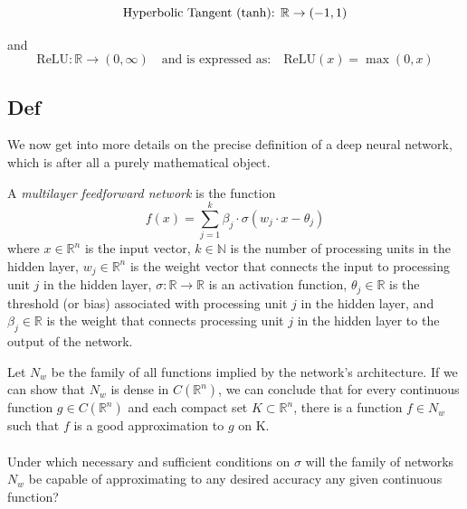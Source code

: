 \documentclass[../main.tex]{subfiles}
\begin{document}
	
	
	\[
	\text{Hyperbolic Tangent (\text{tanh}): } \mathbb{R} \to (-1,1)
	\]
	
	

	 and 
	  \[
	 \text{ReLU}: \mathbb{R} \to (0,\infty)
	 \quad \text{and is expressed as:} \quad
	 \text{ReLU}(x) = \max(0,x)
	 \]
	 \subsection{Def}
	 \noindent  We now get into more details on the precise definition of a deep neural network, which is after all a purely mathematical object. 
	 \begin{definition} A \textit{multilayer feedforward network} is the function
	 	$$f(x)=\sum_{j=1}^k \beta_j \cdot \sigma(w_j \cdot x - \theta_j)$$
	 	where $x \in \mathbb{R}^n$ is the input vector, $k \in \mathbb{N}$ is the number of processing units in the hidden layer, $w_j \in \mathbb{R}^n$ is the weight vector that connects the input to processing unit $j$ in the hidden layer, $\sigma : \mathbb{R} \rightarrow \mathbb{R}$ is an activation function, $\theta_j \in \mathbb{R}$ is the threshold (or bias) associated with processing unit $j$ in the hidden layer, and $\beta_j \in \mathbb{R}$ is the weight that connects processing unit $j$ in the hidden layer to the output of the network.
	 	
	 	
	 \end{definition}
	 
	 \noindent Let $N_{w}$ be the family of all functions implied by the network's architecture.  If we can show that $N_{w}$ is dense in $C(\mathbb{R}^n)$, we can conclude that for every continuous function $g \in C(\mathbb{R}^n) $ and each compact set $K \subset \mathbb{R}^n$, there is a function $f \in N_{w}$ such that $f$ is a good approximation to $g$ on K. \\ \\
	 \noindent Under which necessary and sufficient conditions on $\sigma$ will the family of networks $N_w$ be capable of approximating to any desired accuracy any given continuous function?
	 
	
\end{document}
